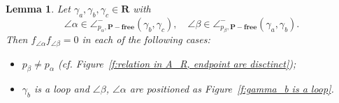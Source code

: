 \documentclass[a4paper,10pt]{amsart}
\theoremstyle{plain}          %
\newtheorem{lemma}[theorem]{Lemma}
\theoremstyle{definition}
\newcommand{\ha}{\angle^-}
\begin{document}
\begin{lemma}\label{l:p_alpha ne p_beta}
    Let $\gamma_a,\gamma_b,\gamma_c\in\mathbf{R}$ with $$\angle\alpha\in\ha_{p_\alpha,\mathbf{P-free}}(\gamma_b,\gamma_c),\quad \angle\beta\in\ha_{p_\beta, \mathbf{P}-\mathbf{free}}(\gamma_a,\gamma_b).$$
    Then $f_{\angle\alpha} f_{\angle\beta}=0$ in each of the following cases:
    \begin{itemize}
        \item [(1)] $p_\beta\ne p_\alpha$ ({\em cf.} Figure~\ref{f:relation in A_R, endpoint are disctinct});
        \item[(2)]$\gamma_b$ is a loop and $\angle\beta$, $\angle\alpha$ are positioned as Figure~\ref{f:gamma_b is a loop}.
    \end{itemize}
   
\end{lemma}
\end{document}
